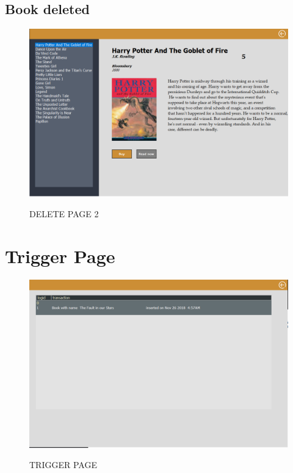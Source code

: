 \subsection{Book deleted}
\begin{figure}[H]
\centering
\caption{DELETE PAGE 2}
\includegraphics[scale=.5]{./ssdelete2.png}
\\[0.2in]
\label{fig:del2}
\end{figure}
\thispagestyle{fancy}
\section{Trigger Page}
\begin{figure}[H]
\centering
\caption{TRIGGER PAGE}
\includegraphics[scale=.5]{./ssinserttrigger.png}
\\[0.2in]
\label{fig:ER diagram}
\end{figure}
\thispagestyle{fancy}


